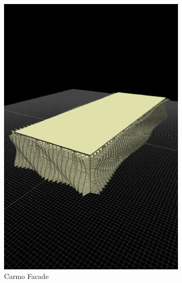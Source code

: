 \begin{figure}
\begin{subfigure}[b]{0.3\linewidth}
    \includegraphics[width=1.0\linewidth]{./images/all_examples/edificio_carmo_crop}
    \caption{Carmo Facade}
    \label{fig:ex:carmo:facade}
  \end{subfigure}
  \begin{subfigure}[b]{0.3\linewidth}

\end{subfigure}
\end{figure}
